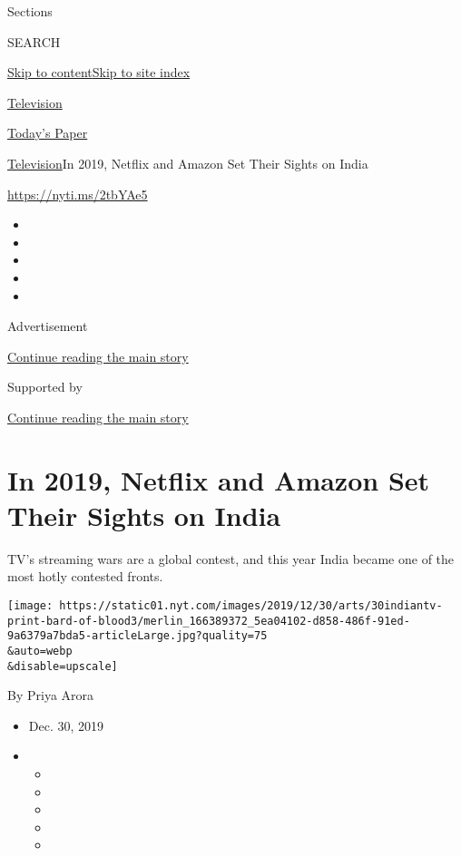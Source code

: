 Sections

SEARCH

\protect\hyperlink{site-content}{Skip to
content}\protect\hyperlink{site-index}{Skip to site index}

\href{https://www.nytimes.com/section/arts/television}{Television}

\href{https://myaccount.nytimes.com/auth/login?response_type=cookie\&client_id=vi}{}

\href{https://www.nytimes.com/section/todayspaper}{Today's Paper}

\href{/section/arts/television}{Television}\textbar{}In 2019, Netflix
and Amazon Set Their Sights on India

\href{https://nyti.ms/2tbYAe5}{https://nyti.ms/2tbYAe5}

\begin{itemize}
\item
\item
\item
\item
\item
\end{itemize}

Advertisement

\protect\hyperlink{after-top}{Continue reading the main story}

Supported by

\protect\hyperlink{after-sponsor}{Continue reading the main story}

\hypertarget{in-2019-netflix-and-amazon-set-their-sights-on-india}{%
\section{In 2019, Netflix and Amazon Set Their Sights on
India}\label{in-2019-netflix-and-amazon-set-their-sights-on-india}}

TV's streaming wars are a global contest, and this year India became one
of the most hotly contested fronts.

\texttt{[image: https://static01.nyt.com/images/2019/12/30/arts/30indiantv-print-bard-of-blood3/merlin\_166389372\_5ea04102-d858-486f-91ed-9a6379a7bda5-articleLarge.jpg?quality=75\\\&auto=webp\\\&disable=upscale]}

By Priya Arora

\begin{itemize}
\item
  Dec. 30, 2019
\item
  \begin{itemize}
  \item
  \item
  \item
  \item
  \item
  \end{itemize}
\end{itemize}

